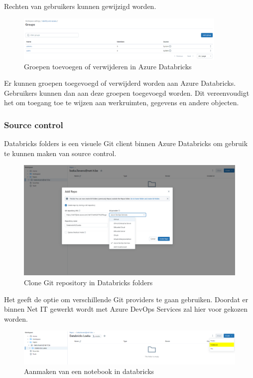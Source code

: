 Rechten van gebruikers kunnen gewijzigd worden.

\begin{figure}[H]
    \centering
    \includegraphics[width=0.9\textwidth]{./graphics/databricks/management_permissions_3.png}
    \caption{Groepen toevoegen of verwijderen in Azure Databricks}
\end{figure}

Er kunnen groepen toegevoegd of verwijderd worden aan Azure Databricks. Gebruikers kunnen dan aan deze groepen toegevoegd worden. Dit vereenvoudigt het om toegang toe te wijzen aan werkruimten, gegevens en andere objecten.

\subsubsection{Source control}

Databricks folders is een visuele Git client binnen Azure Databricks om gebruik te kunnen maken van source control.

\begin{figure}[H]
    \centering
    \includegraphics[width=1\textwidth]{./graphics/databricks/git_1.png}
    \caption{Clone Git repository in Databricks folders}
\end{figure}

Het geeft de optie om verschillende Git providers te gaan gebruiken. Doordat er binnen Net IT gewerkt wordt met Azure DevOps Services zal hier voor gekozen worden.

\begin{figure}[H]
    \includegraphics[width=1\textwidth]{./graphics/databricks/git_2.png}
    \caption{Aanmaken van een notebook in databricks}
\end{figure}

